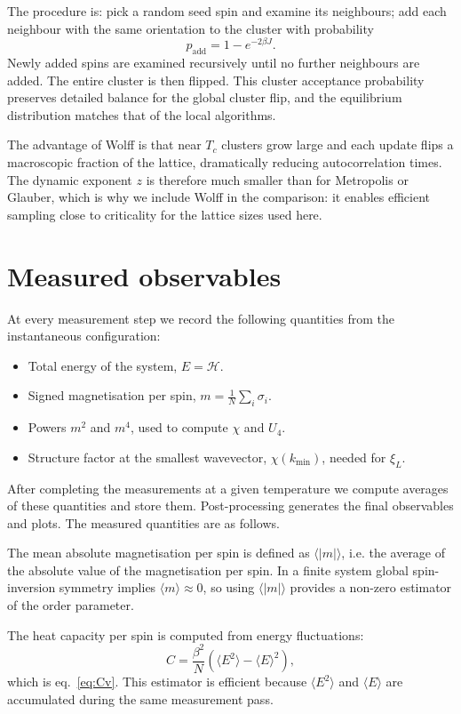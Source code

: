 The procedure is: pick a random seed spin and examine its neighbours; add each neighbour with the same orientation to the cluster with probability
\[ p_{\mathrm{add}}=1-e^{-2\beta J}. \]
Newly added spins are examined recursively until no further neighbours are added. The entire cluster is then flipped. This cluster acceptance probability preserves detailed balance for the global cluster flip, and the equilibrium distribution matches that of the local algorithms.

The advantage of Wolff is that near $T_c$ clusters grow large and each update flips a macroscopic fraction of the lattice, dramatically reducing autocorrelation times. The dynamic exponent $z$ is therefore much smaller than for Metropolis or Glauber, which is why we include Wolff in the comparison: it enables efficient sampling close to criticality for the lattice sizes used here.

\section{Measured observables}

At every measurement step we record the following quantities from the instantaneous configuration:

\begin{itemize}
  \item Total energy of the system, $E=\mathcal{H}$.
  \item Signed magnetisation per spin, $m=\frac{1}{N}\sum_i\sigma_i$.
  \item Powers $m^2$ and $m^4$, used to compute $\chi$ and $U_4$.
  \item Structure factor at the smallest wavevector, $\chi(k_{\min})$, needed for $\xi_L$.
\end{itemize}

After completing the measurements at a given temperature we compute averages of these quantities and store them. Post-processing generates the final observables and plots. The measured quantities are as follows.

The mean absolute magnetisation per spin is defined as $\langle|m|\rangle$, i.e. the average of the absolute value of the magnetisation per spin. In a finite system global spin-inversion symmetry implies $\langle m\rangle\approx0$, so using $\langle|m|\rangle$ provides a non-zero estimator of the order parameter.

The heat capacity per spin is computed from energy fluctuations:
\[ C=\frac{\beta^2}{N}\left(\langle E^2\rangle-\langle E\rangle^2\right), \]
which is eq.~\eqref{eq:Cv}. This estimator is efficient because $\langle E^2\rangle$ and $\langle E\rangle$ are accumulated during the same measurement pass.

